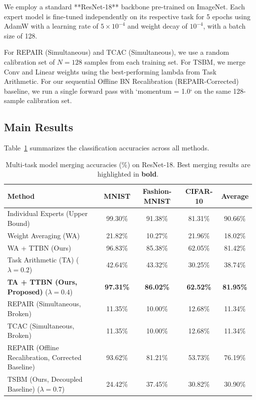 \documentclass{article}
\theoremstyle{plain}
\theoremstyle{definition}
\theoremstyle{remark}
\begin{document}
We employ a standard **ResNet-18** backbone pre-trained on ImageNet. Each expert model is fine-tuned independently on its respective task for 5 epochs using AdamW with a learning rate of $5 \times 10^{-4}$ and weight decay of $10^{-4}$, with a batch size of 128.

For REPAIR (Simultaneous) and TCAC (Simultaneous), we use a random calibration set of $N=128$ samples from each training set. For TSBM, we merge Conv and Linear weights using the best-performing lambda from Task Arithmetic. For our sequential Offline BN Recalibration (REPAIR-Corrected) baseline, we run a single forward pass with `momentum = 1.0` on the same 128-sample calibration set.

\subsection{Main Results}

Table~\ref{tab:results} summarizes the classification accuracies across all methods.

\begin{table}[t]
\caption{Multi-task model merging accuracies (\%) on ResNet-18. Best merging results are highlighted in \textbf{bold}.}
\label{tab:results}
\vskip 0.15in
\begin{center}
\begin{small}
\begin{tabular}{lcccc}
\toprule
Method & MNIST & Fashion-MNIST & CIFAR-10 & Average \\
\midrule
Individual Experts (Upper Bound) & 99.30\% & 91.38\% & 81.31\% & 90.66\% \\
\midrule
Weight Averaging (WA) & 21.82\% & 10.27\% & 21.96\% & 18.02\% \\
WA + TTBN (Ours) & 96.83\% & 85.38\% & 62.05\% & 81.42\% \\
Task Arithmetic (TA) ($\lambda = 0.2$) & 42.64\% & 43.32\% & 30.25\% & 38.74\% \\
\textbf{TA + TTBN (Ours, Proposed)} ($\lambda = 0.4$) & \textbf{97.31\%} & \textbf{86.02\%} & \textbf{62.52\%} & \textbf{81.95\%} \\
\midrule
REPAIR (Simultaneous, Broken) & 11.35\% & 10.00\% & 12.68\% & 11.34\% \\
TCAC (Simultaneous, Broken) & 11.35\% & 10.00\% & 12.68\% & 11.34\% \\
REPAIR (Offline Recalibration, Corrected Baseline) & 93.62\% & 81.21\% & 53.73\% & 76.19\% \\
\midrule
TSBM (Ours, Decoupled Baseline) ($\lambda = 0.7$) & 24.42\% & 37.45\% & 30.82\% & 30.90\% \\
\bottomrule
\end{tabular}
\end{small}
\end{center}
\vskip -0.1in
\end{table}
\end{document}
